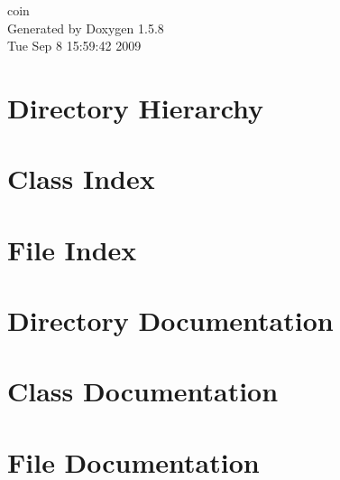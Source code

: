 \documentclass[a4paper]{book}
\begin{document}
\begin{titlepage}
\vspace*{7cm}
\begin{center}
{\Large coin }\\
\vspace*{1cm}
{\large Generated by Doxygen 1.5.8}\\
\vspace*{0.5cm}
{\small Tue Sep 8 15:59:42 2009}\\
\end{center}
\end{titlepage}
\clearemptydoublepage
{}
\tableofcontents
\clearemptydoublepage
{}
\chapter{Directory Hierarchy}

\chapter{Class Index}

\chapter{File Index}

\chapter{Directory Documentation}

\chapter{Class Documentation}

\chapter{File Documentation}









\printindex
\end{document}
